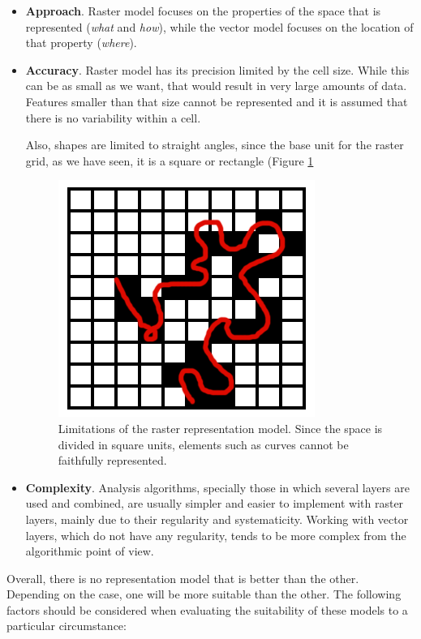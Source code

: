 \begin{itemize}
\item \textbf{Approach}. Raster model focuses on the properties of the space that is represented (\emph{what} and \emph{how}), while the vector model focuses on the location of that property (\emph{where}).
 \item \textbf{Accuracy}. Raster model has its precision limited by the cell size. While this can be as small as we want, that would result in very large amounts of data. Features smaller than that size cannot be represented and it is assumed that there is no variability within a cell.

 Also, shapes are limited to straight angles, since the base unit for the raster grid, as we have seen, it is a square or rectangle (Figure \ref{Fig:Raster_accuracy}

\begin{figure}[!hbt]   
\centering
\includegraphics[width=.4\columnwidth]{Data/Raster_accuracy.png}
\caption{\small Limitations of the raster representation model. Since the space is divided in square units, elements such as curves cannot be faithfully represented.}
\label{Fig:Raster_accuracy} 
\end{figure}

\item \textbf{Complexity}. Analysis algorithms, specially those in which several layers are used and combined, are usually simpler and easier to implement with raster layers, mainly due to their regularity and systematicity. Working with vector layers, which do not have any regularity, tends to be more complex from the algorithmic point of view.
\end{itemize}

Overall, there is no representation model that is better than the other. Depending on the case, one will be more suitable than the other. The following factors should be considered when evaluating the suitability of these models to a particular circumstance:

